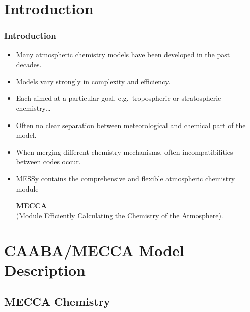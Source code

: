\documentclass[t]{beamer}
\begin{document}
\section{Introduction}

\begin{frame}

  \frametitle{Introduction}

  \begin{itemize}
  \item Many atmospheric chemistry models have been developed in the
    past decades.
  \item Models vary strongly in complexity and efficiency.
  \item Each aimed at a particular goal, e.g.\ tropospheric or
    stratospheric chemistry\dots
  \item Often no clear separation between meteorological and chemical
    part of the model.
  \item When merging different chemistry mechanisms, often
    incompatibilities between codes occur.
  \item MESSy contains the comprehensive and flexible atmospheric
    chemistry module
    \begin{center}
      {\large\bf MECCA}\\
      (\underline{M}odule \underline{E}fficiently
      \underline{C}alculating the \underline{C}hemistry of the
      \underline{A}tmosphere).
    \end{center}
  \end{itemize}

\end{frame}


\section{CAABA/MECCA Model Description}
\subsection{MECCA Chemistry}
\end{document}
